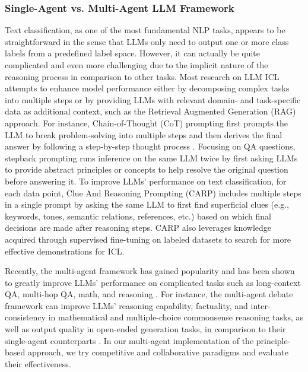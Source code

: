 \subsubsection{Single-Agent vs. Multi-Agent LLM Framework}
Text classification, as one of the most fundamental NLP tasks, appears to be straightforward in the sense that LLMs only need to output one or more class labels from a predefined label space. However, it can actually be quite complicated and even more challenging due to the implicit nature of the reasoning process in comparison to other tasks. Most research on LLM ICL attempts to enhance model performance either by decomposing complex tasks into multiple steps or by providing LLMs with relevant domain- and task-specific data as additional context, such as the Retrieval Augmented Generation (RAG) approach. For instance, Chain-of-Thought (CoT) prompting first prompts the LLM to break problem-solving into multiple steps and then derives the final answer by following a step-by-step thought process \cite{wei2022chain}. Focusing on QA questions, stepback prompting \cite{zheng2023take} runs inference on the same LLM twice by first asking LLMs to provide abstract principles or concepts to help resolve the original question before answering it. To improve LLMs' performance on text classification, for each data point, Clue And Reasoning Prompting (CARP) \cite{sun2023text} includes multiple steps in a single prompt by asking the same LLM to first find superficial clues (e.g., keywords, tones, semantic relations, references, etc.) based on which final decisions are made after reasoning steps. CARP also leverages knowledge acquired through supervised fine-tuning on labeled datasets to search for more effective demonstrations for ICL. 

Recently, the multi-agent framework has gained popularity and has been shown to greatly improve LLMs' performance on complicated tasks such as long-context QA, multi-hop QA, math, and reasoning \cite{shridhar2022distilling, wang2022self}. For instance, the multi-agent debate framework can improve LLMs' reasoning capability, factuality, and inter-consistency in mathematical and multiple-choice commonsense reasoning tasks, as well as output quality in open-ended generation tasks, in comparison to their single-agent counterparts \cite{du2023improving, xiong2023examining, chan2023chateval}. In our multi-agent implementation of the principle-based approach, we try competitive and collaborative paradigms and evaluate their effectiveness.


